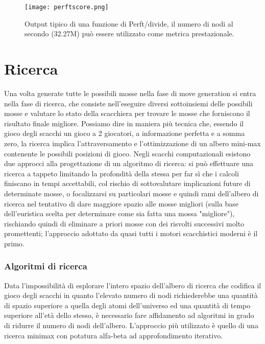 \begin{figure}[H]
    \centering
    \texttt{[image: perftscore.png]}
    \caption{Output tipico di una funzione di Perft/divide, il numero di nodi al secondo (32.27M) può essere utilizzato come metrica prestazionale.}
    \label{perftscore}
\end{figure}


\section{Ricerca} \label{ricerca}
Una volta generate tutte le possibili mosse nella fase di move generation si entra nella fase di ricerca, che consiste nell'eseguire diversi sottoinsiemi delle possibili mosse e valutare
lo stato della scacchiera per trovare le mosse che forniscono il risultato finale migliore. Possiamo dire in maniera più tecnica che, essendo il gioco degli scacchi un gioco
a 2 giocatori, a informazione perfetta e a somma zero, la ricerca implica l'attraversamento e l'ottimizzazione di un albero mini-max contenente le possibili posizioni di gioco.
Negli scacchi computazionali esistono due approcci alla progettazione di un algoritmo di ricerca: si può effettuare una ricerca a tappeto limitando la profondità
della stessa per far sì che i calcoli finiscano in tempi accettabili, col rischio di sottovalutare implicazioni future di determinate mosse, o focalizzarsi su particolari mosse e quindi
rami dell'albero di ricerca nel tentativo di dare maggiore spazio alle mosse migliori (sulla base dell'euristica scelta per determinare come sia fatta una mossa "migliore"), rischiando
quindi di eliminare a priori mosse con dei risvolti successivi molto promettenti; l'approccio adottato da quasi tutti i motori scacchistici moderni è il primo.

\subsubsection{Algoritmi di ricerca}
Data l'impossibilità di esplorare l'intero spazio dell'albero di ricerca che codifica il gioco degli scacchi in quanto l'elevato numero di nodi richiederebbe una quantità di spazio superiore
a quella degli atomi dell'universo ed una quantità di tempo superiore all'età dello stesso, è necessario fare affidamento ad algoritmi in
grado di ridurre il numero di nodi dell'albero. L'approccio più utilizzato è quello di una ricerca minimax con potatura alfa-beta ad approfondimento iterativo.


